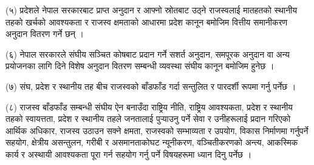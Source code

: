 (५) प्रदेशले नेपाल सरकारबाट प्राप्त अनुदान र आफ्नो स्रोतबाट उठ्ने राजस्वलाई मातहतको स्थानीय तहको खर्चको आवश्यकता र राजस्व क्षमताको आधारमा प्रदेश कानून बमोजिम वित्तीय समानीकरण अनुदान वितरण गर्ने छन् ।

(६) नेपाल सरकारले संघीय सञ्चित कोषबाट प्रदान गर्ने सशर्त अनुदान, समपूरक अनुदान वा अन्य प्रयोजनका लागि दिने विशेष अनुदान
वितरण सम्बन्धी व्यवस्था संघीय कानून बमोजिम हुनेछ ।

(७) संघ, प्रदेश र स्थानीय तह बीच राजस्वको बाँडफाँड गर्दा सन्तुलित र पारदर्शी रूपमा गर्नु पर्नेछ ।

(८) राजस्व बाँडफाँड सम्बन्धी संघीय ऐन बनाउँदा राष्ट्रिय नीति, राष्ट्रिय आवश्यकता, प्रदेश र स्थानीय तहको स्वायत्तता, प्रदेश र स्थानीय
तहले जनतालाई पुर्‍याउनु पर्ने सेवा र उनीहरूलाई प्रदान गरिएको आर्थिक अधिकार, राजस्व उठाउन सक्ने क्षमता, राजस्वको सम्भाव्यता र उपयोग, विकास निर्माणमा गर्नुपर्ने सहयोग, क्षेत्रीय असन्तुलन, गरीबी र असमानताकोघट न्यूनीकरण, वञ्चितीकरणको अन्त्य, आकस्मिक कार्य र अस्थायी आवश्यकता पूरा गर्न सहयोग गर्नु पर्ने विषयहरूमा ध्यान दिनु पर्नेछ ।
